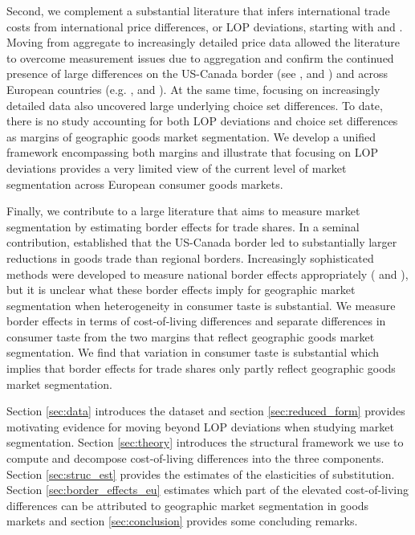 Second, we complement a substantial literature that infers international trade costs from international price differences, or LOP deviations, starting with \citet{Engel1996} and \citet{Goldberg1997}. Moving from aggregate to increasingly detailed price data allowed the literature to overcome measurement issues due to aggregation and confirm the continued presence of large differences on the US-Canada border (see \citet{Broda2008}, \citet{Gorodnichenko2009} and \citet{Gopinath2011}) and across European countries (e.g. \citet{Cavallo2014}, \citet{Fontaine2020} and \citet{Beck2020}). At the same time, focusing on increasingly detailed data also uncovered large underlying choice set differences. To date, there is no study accounting for both LOP deviations and choice set differences as margins of geographic goods market segmentation. We develop a unified framework encompassing both margins and illustrate that focusing on LOP deviations provides a very limited view of the current level of market segmentation across European consumer goods markets. 

Finally, we contribute to a large literature that aims to measure market segmentation by estimating border effects for trade shares. In a seminal contribution, \citet{McCallum1995} established that the US-Canada border led to substantially larger reductions in goods trade than regional borders. Increasingly sophisticated methods were developed to measure national border effects appropriately (\citet{Anderson2003} and \citet{Santamaria2021}), but it is unclear what these border effects imply for geographic market segmentation when heterogeneity in consumer taste is substantial. We measure border effects in terms of cost-of-living differences and separate differences in consumer taste from the two margins that reflect geographic goods market segmentation. We find that variation in consumer taste is substantial which implies that border effects for trade shares only partly reflect geographic goods market segmentation. 

Section \ref{sec:data} introduces the dataset and section \ref{sec:reduced_form} provides motivating evidence for moving beyond LOP deviations when studying market segmentation. Section \ref{sec:theory} introduces the structural framework we use to compute and decompose cost-of-living differences into the three components. Section \ref{sec:struc_est} provides the estimates of the elasticities of substitution. Section \ref{sec:border_effects_eu} estimates which part of the elevated cost-of-living differences can be attributed to geographic market segmentation in goods markets and section \ref{sec:conclusion} provides some concluding remarks. 
